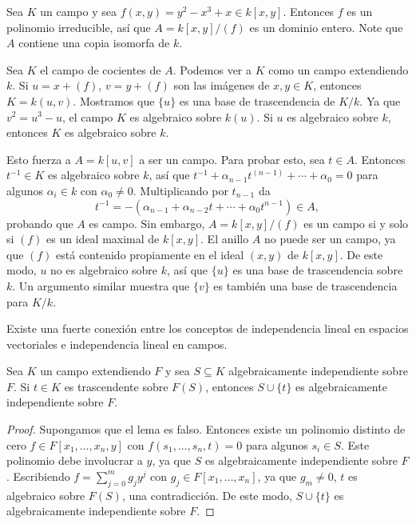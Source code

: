 \begin{example}
  Sea $K$ un campo y sea $f(x,y) = y^2 - x^3 + x \in k[x,y]$. Entonces $f$ es un polinomio irreducible, así que $A = k[x,y]/(f)$ es un dominio entero. Note que $A$ contiene una copia isomorfa de $k$.

  Sea $K$ el campo de cocientes de $A$. Podemos ver a $K$ como un campo extendiendo $k$. Si $u = x + (f)$, $v = y + (f)$ son las imágenes de $x,y \in K$, entonces $K = k(u,v)$. Mostramos que $\{u\}$ es una base de trascendencia de $K/k$. Ya que $v^2 = u^3 - u$, el campo $K$ es algebraico sobre $k(u)$. Si $u$ es algebraico sobre $k$, entonces $K$ es algebraico sobre $k$.

  Esto fuerza a $A = k[u,v]$ a ser un campo. Para probar esto, sea $t \in A$. Entonces $t^{-1} \in K$ es algebraico sobre $k$, así que $t^{-1} + \alpha_{n-1}t^{(n-1)} + \cdots + \alpha_0 = 0$ para algunos $\alpha_i \in k$ con $\alpha_0 \neq 0$. Multiplicando por $t_{n-1}$ da
  \[
    t^{-1} = -(\alpha_{n-1} + \alpha_{n-2}t + \cdots + \alpha_0 t^{n-1})\in A,
  \]
  probando que $A$ es campo. Sin embargo, $A = k[x,y]/(f)$ es un campo si y solo si $(f)$ es un ideal maximal de $k[x,y]$. El anillo $A$ no puede ser un campo, ya que $(f)$ está contenido propiamente en el ideal $(x,y)$ de $k[x,y]$. De este modo, $u$ no es algebraico sobre $k$, así que $\{u\}$ es una base de trascendencia sobre $k$. Un argumento similar muestra que $\{v\}$ es también una base de trascendencia para $K/k$.
\end{example}

Existe una fuerte conexión entre los conceptos de independencia lineal en espacios vectoriales e independencia lineal en campos.

\begin{lemma}\label{lemma:2.1.12}%
  Sea $K$ un campo extendiendo $F$ y sea $S \subseteq K$ algebraicamente independiente sobre $F$. Si $t\in K$ es trascendente sobre $F(S)$, entonces $S \cup \{t\}$ es algebraicamente independiente sobre $F$.
\end{lemma}
\begin{proof}
  Supongamos que el lema es falso. Entonces existe un polinomio distinto de cero $f \in F[x_1, \ldots, x_n, y]$ con $f(s_1, \ldots, s_n, t) = 0$ para algunos $s_i \in S$. Este polinomio debe involucrar a $y$, ya que $S$ es algebraicamente independiente sobre $F$. Escribiendo $f = \sum_{j=0}^m g_j y^j$ con $g_j \in F[x_1, \ldots, x_n]$, ya que $g_m \neq 0 $, $t$ es algebraico sobre $F(S)$, una contradicción. De este modo, $S \cup \{t\}$ es algebraicamente independiente sobre $F$.
\end{proof}

